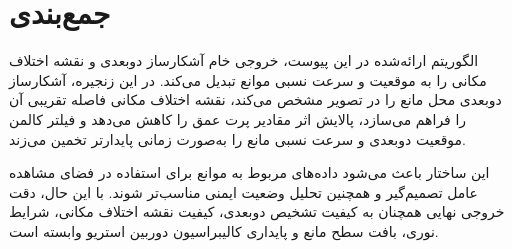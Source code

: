 \section{جمع‌بندی}

الگوریتم ارائه‌شده در این پیوست، خروجی خام آشکارساز دوبعدی و نقشه اختلاف مکانی را به موقعیت و سرعت نسبی موانع تبدیل می‌کند. در این زنجیره، آشکارساز دوبعدی محل مانع را در تصویر مشخص می‌کند، نقشه اختلاف مکانی فاصله تقریبی آن را فراهم می‌سازد، پالایش  اثر مقادیر پرت عمق را کاهش می‌دهد و فیلتر کالمن موقعیت دوبعدی و سرعت نسبی مانع را به‌صورت زمانی پایدارتر تخمین می‌زند.

این ساختار باعث می‌شود داده‌های مربوط به موانع برای استفاده در فضای مشاهده عامل تصمیم‌گیر و همچنین تحلیل وضعیت ایمنی مناسب‌تر شوند. با این حال، دقت خروجی نهایی همچنان به کیفیت تشخیص دوبعدی، کیفیت نقشه اختلاف مکانی، شرایط نوری، بافت سطح مانع و پایداری کالیبراسیون دوربین استریو وابسته است.

